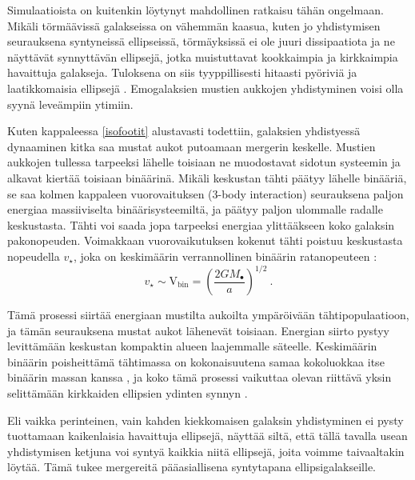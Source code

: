 \documentclass[12pt,a4paper]{article}
\begin{document}
Simulaatioista on kuitenkin löytynyt mahdollinen ratkaisu tähän ongelmaan. Mikäli tör\-mää\-vissä galakseissa on vähemmän kaasua, kuten jo yhdistymisen seurauksena syntyneissä ellipseissä, törmäyksissä ei ole juuri dissipaatiota ja ne näyttävät synnyttävän ellipsejä, jotka muistuttavat kookkaimpia ja kirkkaimpia havaittuja galakseja. Tuloksena on siis tyyppillisesti hitaasti pyöriviä ja laatikkomaisia ellipsejä \citep{knochfar:2005, naab:2006, cox:2006}. Emogalaksien mustien aukkojen yhdistyminen voisi olla syynä leveämpiin ytimiin.

Kuten kappaleessa \ref{isofootit} alustavasti todettiin, galaksien yhdistyessä dynaaminen kitka saa mustat aukot putoamaan mergerin keskelle. Mustien aukkojen tullessa tarpeeksi lähelle toisiaan ne muodostavat sidotun systeemin ja alkavat kiertää toisiaan binäärinä. Mikäli keskustan tähti päätyy lähelle binääriä, se saa kolmen kappaleen vuorovaituksen (3-body interaction) seurauksena paljon energiaa massiiviselta binäärisysteemiltä, ja päätyy paljon ulommalle radalle keskustasta. Tähti voi saada jopa tarpeeksi energiaa ylittääkseen koko galaksin pakonopeuden. Voimakkaan vuorovaikutuksen kokenut tähti poistuu keskustasta nopeudella $v_\star$, joka on keskimäärin verrannollinen binäärin ratanopeuteen \citep{rantala:2018} :
\begin{equation}
v_\star \sim \mathrm{V_{bin}} = \left( \frac{2 G M_\bullet}{a} \right)^{1/2} \ .
\end{equation}

Tämä prosessi siirtää energiaan mustilta aukoilta ympäröivään tähtipopulaatioon, ja tämän seurauksena mustat aukot lähenevät toisiaan. Energian siirto pystyy levittämään keskustan kompaktin alueen laajemmalle säteelle. Keskimäärin binäärin poisheittämä tähtimassa on kokonaisuutena samaa kokoluokkaa itse binäärin massan kanssa \citep{gualandris:2007}, ja koko tämä prosessi vaikuttaa olevan riittävä yksin selittämään kirkkaiden ellipsien ydinten synnyn \citep{begelman:1980, ebisuzaki:1991, faber:1997, milosavljevic:2002}.


Eli vaikka perinteinen, vain kahden kiekkomaisen galaksin yhdistyminen ei pysty tuottamaan kaikenlaisia havaittuja ellipsejä, näyttää siltä, että tällä tavalla usean yhdistymisen ketjuna voi syntyä kaikkia niitä ellipsejä, joita voimme taivaaltakin löytää. Tämä tukee mergereitä pääasiallisena syntytapana ellipsigalakseille. 
\end{document}
